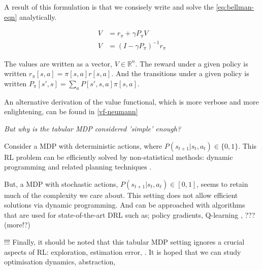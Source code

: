 A result of this formulation is that we consisely write and solve the \eqref{eq:bellman-eqn} analytically. \footnotemark[1]


\begin{align}
V &= r_{\pi} + \gamma P_{\pi} V \tag{tabular Bellman eqn}\\
V &= (I-\gamma P_{\pi})^{-1}r_{\pi}  \label{eq:value-functional}\tag{Value functional}
\end{align}

The values are written as a vector, $V \in \mathbb R^n$.
The reward under a given policy is written $r_{\pi}[s, a] = \pi[s, a] r[s, a]$.
And the transitions under a given policy is written $P_{\pi}[s', s] = \sum_a P[s', s, a]\pi[s, a]$.

An alternative derivation of the value functional, which is more verbose and more enlightening, can be found in \ref{vf-neumann}

\begin{displayquote}
\textit{But why is the tabular MDP considered 'simple' enough?}
\end{displayquote}

Consider a MDP with deterministic actions, where $P(s_{t+1}|s_t, a_t) \in \{ 0, 1\}$.
This RL problem can be efficiently solved by non-statistical
methods: dynamic programming and related planning techniques \cite{Bertsekas1995}.

But, a MDP with stochastic actions, $P(s_{t+1}|s_t, a_t) \in [0, 1]$,
seems to retain much of the complexity we care about. This setting does not allow
efficient solutions via dynamic programming. And can be approached with algorithms
that are used for state-of-the-art DRL such as;
policy gradients\cite{Schulman2015a}, Q-learning \cite{Mnih2015}, ??? (more!?)

{\color{red}!!!}
Finally, it should be noted that this tabular MDP setting ignores a crucial
aspects of RL: exploration, estimation error, . It is hoped that we can study
optimisation dynamics,  abstraction,

